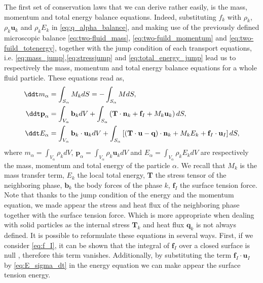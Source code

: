The first set of conservation laws that we can derive rather easily, is  the mass, momentum and total energy balance equations. 
Indeed, substituting $f_k$ with $\rho_k$, $\rho_k \textbf{u}_k$ and $\rho_k E_k$  in \ref{eq:q_alpha_balance}, and making use of the previously defined microscopic balance \ref{eq:two-fluid_mass}, \ref{eq:two-fuild_momentum} and \ref{eq:two-fuild_totenergy}, together with the jump condition of each transport equations, i.e. \ref{eq:mass_jump},\ref{eq:stressjump} and \ref{eq:total_energy_jump} lead us to respectively the mass, momentum and total energy balance equations for a whole fluid particle.
These equations read as,
\begin{align}
    \label{eq:dt_m_alpha}
    \ddt m_\alpha 
    &= \int_{S_\alpha} M_k dS
    = - \int_{S_\alpha} M dS, \\
    \label{eq:dt_p_alpha}
    \ddt \textbf{p}_\alpha 
    &= \int_{V_\alpha} \textbf{b}_k dV
    + \int_{S_\alpha} \left(
    \textbf{T}\cdot\textbf{n}_k
    + \textbf{f}_I 
    + M_k \textbf{u}_k
    \right)dS, \\
    \label{eq:dt_e_alpha}
    \ddt E_\alpha 
    &= \int_{V_\alpha} \textbf{b}_k \cdot \textbf{u}_k dV 
    + \int_{S_\alpha} \left[
        (\textbf{T}\cdot \textbf{u} 
    - \textbf{q})\cdot\textbf{n}_k 
    + M_k E_k 
    + \textbf{f}_I \cdot \textbf{u}_I 
    \right]dS, 
\end{align}
where $m_\alpha =  \int_{V_\alpha} \rho_k dV$, $\textbf{p}_\alpha= \int_{V_\alpha} \rho_k \textbf{u}_k dV$ and $E_\alpha= \int_{V_\alpha} \rho_kE_k dV$ are respectively the mass, momentum and total energy of the particle $\alpha$. 
We recall that $M_k$ is the mass transfer term, $E_k$ the local total energy, \textbf{T} the stress tensor of the neighboring phase, $\textbf{b}_k$ the body forces of the phase $k$, $\textbf{f}_I$ the surface tension force. 
Note that thanks to the jump condition of the energy and the momentum equation, we made appear the stress and heat flux of the neighboring phase together with the surface tension force. 
Which is more appropriate when dealing with solid particles as the internal stress $\textbf{T}_k$ and heat flux $\textbf{q}_k$ is not always defined. 
It is possible to reformulate these equations in several ways. 
First, if we consider \ref{eq:f_I}, it can be shown that the integral of $\textbf{f}_I$ over a closed surface is null \citep[Appendix B]{tryggvason2011direct}, therefore this term vanishes.
Additionally, by substituting the term $\textbf{f}_I \cdot \textbf{u}_I$ by \ref{eq:E_sigma_dt} in the energy equation we can make appear the surface tension energy.  

